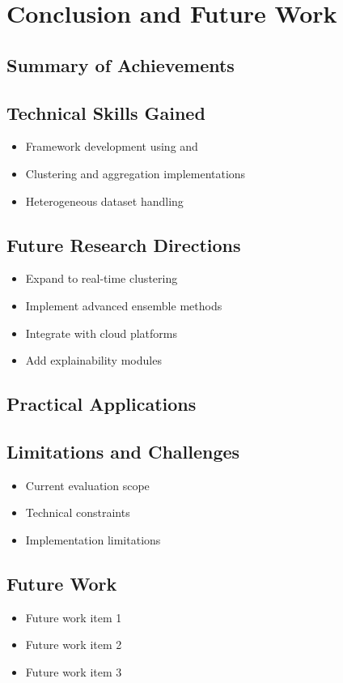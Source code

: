 \chapter{Conclusion and Future Work}
\label{ch:conclusion}

\section{Summary of Achievements}

\section{Technical Skills Gained}
\begin{itemize}
\item Framework development using \KFCProcedure{} and \GradientCOBRA{}
\item Clustering and aggregation implementations
\item Heterogeneous dataset handling
\end{itemize}

\section{Future Research Directions}
\begin{itemize}
\item Expand to real-time clustering
\item Implement advanced ensemble methods
\item Integrate with cloud platforms
\item Add explainability modules
\end{itemize}

\section{Practical Applications}

\section{Limitations and Challenges}
\begin{itemize}
\item Current evaluation scope
\item Technical constraints
\item Implementation limitations
\end{itemize}

\section{Future Work}
\begin{itemize}
    \item Future work item 1
    \item Future work item 2
    \item Future work item 3
\end{itemize}

